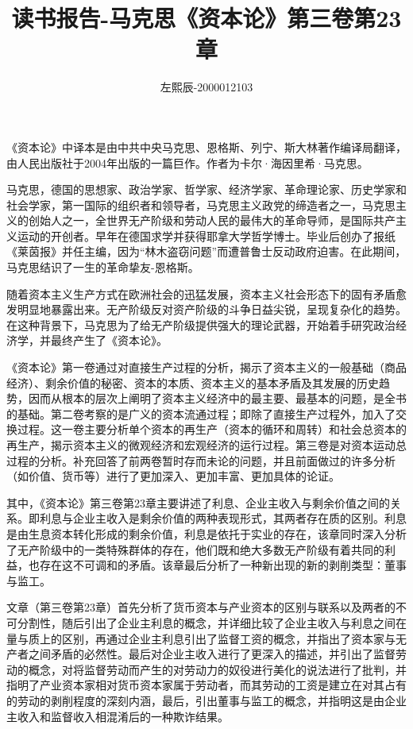 \documentclass[utf8]{ctexart}
\title{读书报告-马克思《资本论》第三卷第23章}
\author{左熙辰-2000012103}
\date{}
\begin{document}
	\maketitle
	《资本论》中译本是由中共中央马克思、恩格斯、列宁、斯大林著作编译局翻译，由人民出版社于2004年出版的一篇巨作。作者为卡尔·海因里希·马克思。
	
	马克思，德国的思想家、政治学家、哲学家、经济学家、革命理论家、历史学家和社会学家，第一国际的组织者和领导者，马克思主义政党的缔造者之一，马克思主义的创始人之一，全世界无产阶级和劳动人民的最伟大的革命导师，是国际共产主义运动的开创者。早年在德国求学并获得耶拿大学哲学博士。毕业后创办了报纸《莱茵报》并任主编，因为“林木盗窃问题”而遭普鲁士反动政府迫害。在此期间，马克思结识了一生的革命挚友-恩格斯。
	
	
	
	随着资本主义生产方式在欧洲社会的迅猛发展，资本主义社会形态下的固有矛盾愈发明显地暴露出来。无产阶级反对资产阶级的斗争日益尖锐，呈现复杂化的趋势。在这种背景下，马克思为了给无产阶级提供强大的理论武器，开始着手研究政治经济学，并最终产生了《资本论》。
	
	《资本论》第一卷通过对直接生产过程的分析，揭示了资本主义的一般基础（商品经济）、剩余价值的秘密、资本的本质、资本主义的基本矛盾及其发展的历史趋势，因而从根本的层次上阐明了资本主义经济中的最主要、最基本的问题，是全书的基础。第二卷考察的是广义的资本流通过程；即除了直接生产过程外，加入了交换过程。这一卷主要分析单个资本的再生产（资本的循环和周转）和社会总资本的再生产，揭示资本主义的微观经济和宏观经济的运行过程。第三卷是对资本运动总过程的分析。补充回答了前两卷暂时存而未论的问题，并且前面做过的许多分析（如价值、货币等）进行了更加深入、更加丰富、更加具体的论证。
	
	其中，《资本论》第三卷第23章主要讲述了利息、企业主收入与剩余价值之间的关系。即利息与企业主收入是剩余价值的两种表现形式，其两者存在质的区别。利息是由生息资本转化形成的剩余价值，利息是依托于实业的存在，该章同时深入分析了无产阶级中的一类特殊群体的存在，他们既和绝大多数无产阶级有着共同的利益，也存在这不可调和的矛盾。该章最后分析了一种新出现的新的剥削类型：董事与监工。
	
	文章（第三卷第23章）首先分析了货币资本与产业资本的区别与联系以及两者的不可分割性，随后引出了企业主利息的概念，并详细比较了企业主收入与利息之间在量与质上的区别，再通过企业主利息引出了监督工资的概念，并指出了资本家与无产者之间矛盾的必然性。最后对企业主收入进行了更深入的描述，并引出了监督劳动的概念，对将监督劳动而产生的对劳动力的奴役进行美化的说法进行了批判，并指明了产业资本家相对货币资本家属于劳动者，而其劳动的工资是建立在对其占有的劳动的剥削程度的深刻内涵，最后，引出董事与监工的概念，并指明这是由企业主收入和监督收入相混淆后的一种欺诈结果。
	
\end{document}
